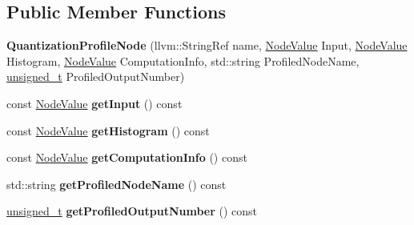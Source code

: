 \subsection*{Public Member Functions}
\begin{DoxyCompactItemize}
\item 
\mbox{\label{classglow_1_1_quantization_profile_node_a70e41337e08c2c618fe4ed28989b0e3d}} 
{\bfseries Quantization\+Profile\+Node} (llvm\+::\+String\+Ref name, \hyperlink{structglow_1_1_node_value}{Node\+Value} Input, \hyperlink{structglow_1_1_node_value}{Node\+Value} Histogram, \hyperlink{structglow_1_1_node_value}{Node\+Value} Computation\+Info, std\+::string Profiled\+Node\+Name, \hyperlink{namespaceglow_a0ca574644e1e42ef193a9947fb4d8911}{unsigned\+\_\+t} Profiled\+Output\+Number)
\item 
\mbox{\label{classglow_1_1_quantization_profile_node_a2f7c67f5a90243f61034ace3f5a549e8}} 
const \hyperlink{structglow_1_1_node_value}{Node\+Value} {\bfseries get\+Input} () const
\item 
\mbox{\label{classglow_1_1_quantization_profile_node_af91fc411a1d60b39dbac1bcc6131cf32}} 
const \hyperlink{structglow_1_1_node_value}{Node\+Value} {\bfseries get\+Histogram} () const
\item 
\mbox{\label{classglow_1_1_quantization_profile_node_a4dcb7cb1d5523ebcb2ac4686ee002d5d}} 
const \hyperlink{structglow_1_1_node_value}{Node\+Value} {\bfseries get\+Computation\+Info} () const
\item 
\mbox{\label{classglow_1_1_quantization_profile_node_a01be1424d28ada4db9f52e2dc03dc664}} 
std\+::string {\bfseries get\+Profiled\+Node\+Name} () const
\item 
\mbox{\label{classglow_1_1_quantization_profile_node_a1571fdd51151587bfa749a9666721fce}} 
\hyperlink{namespaceglow_a0ca574644e1e42ef193a9947fb4d8911}{unsigned\+\_\+t} {\bfseries get\+Profiled\+Output\+Number} () const
\item 
\mbox{\label{classglow_1_1_quantization_profile_node_af8a885f356a4d03cf0c7b1e37364ed1e}} 

\end{DoxyCompactItemize}
